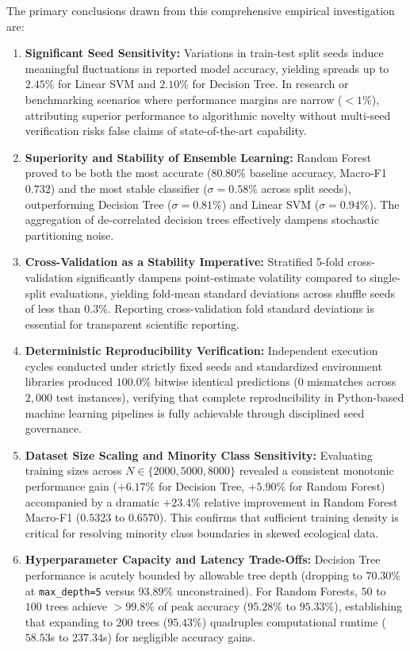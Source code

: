 The primary conclusions drawn from this comprehensive empirical investigation are:
\begin{enumerate}
    \item \textbf{Significant Seed Sensitivity:} Variations in train-test split seeds induce meaningful fluctuations in reported model accuracy, yielding spreads up to $2.45\%$ for Linear SVM and $2.10\%$ for Decision Tree. In research or benchmarking scenarios where performance margins are narrow ($< 1\%$), attributing superior performance to algorithmic novelty without multi-seed verification risks false claims of state-of-the-art capability.
    \item \textbf{Superiority and Stability of Ensemble Learning:} Random Forest proved to be both the most accurate ($80.80\%$ baseline accuracy, Macro-F1 $0.732$) and the most stable classifier ($\sigma = 0.58\%$ across split seeds), outperforming Decision Tree ($\sigma = 0.81\%$) and Linear SVM ($\sigma = 0.94\%$). The aggregation of de-correlated decision trees effectively dampens stochastic partitioning noise.
    \item \textbf{Cross-Validation as a Stability Imperative:} Stratified 5-fold cross-validation significantly dampens point-estimate volatility compared to single-split evaluations, yielding fold-mean standard deviations across shuffle seeds of less than $0.3\%$. Reporting cross-validation fold standard deviations is essential for transparent scientific reporting.
    \item \textbf{Deterministic Reproducibility Verification:} Independent execution cycles conducted under strictly fixed seeds and standardized environment libraries produced $100.0\%$ bitwise identical predictions ($0$ mismatches across $2,000$ test instances), verifying that complete reproducibility in Python-based machine learning pipelines is fully achievable through disciplined seed governance.
    \item \textbf{Dataset Size Scaling and Minority Class Sensitivity:} Evaluating training sizes across $N \in \{2000, 5000, 8000\}$ revealed a consistent monotonic performance gain ($+6.17\%$ for Decision Tree, $+5.90\%$ for Random Forest) accompanied by a dramatic $+23.4\%$ relative improvement in Random Forest Macro-F1 ($0.5323$ to $0.6570$). This confirms that sufficient training density is critical for resolving minority class boundaries in skewed ecological data.
    \item \textbf{Hyperparameter Capacity and Latency Trade-Offs:} Decision Tree performance is acutely bounded by allowable tree depth (dropping to $70.30\%$ at \texttt{max\_depth=5} versus $93.89\%$ unconstrained). For Random Forests, $50$ to $100$ trees achieve $>99.8\%$ of peak accuracy ($95.28\%$ to $95.33\%$), establishing that expanding to $200$ trees ($95.43\%$) quadruples computational runtime ($58.53$s to $237.34$s) for negligible accuracy gains.

\end{enumerate}
